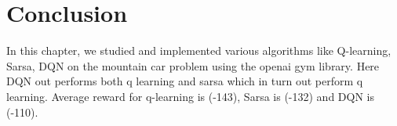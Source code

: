 \newline \section{Conclusion}
In this chapter, we studied and implemented various algorithms like Q-learning, Sarsa, DQN on the mountain car problem using the openai gym library. Here DQN out performs both q learning and sarsa which in turn out perform q learning. Average reward for q-learning is (-143), Sarsa is (-132) and DQN is (-110).

